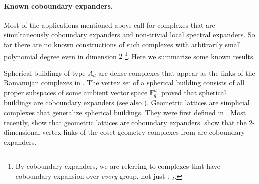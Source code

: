 \documentclass[10pt,a4paper]{article}
\theoremstyle{definition}
\theoremstyle{remark}
\newcommand\sett[2]{\left\{ #1 \left| \; \vphantom{#1 #2} \right. #2  \right\}}
\newcommand{\F}{\mathbb{F}}
\renewcommand{\ge}{\geqslant}
\numberwithin{equation}{section}
\let\origparagraph\paragraph
\renewcommand{\paragraph}[1]{\origparagraph{#1.}}
\begin{document}
%
%

\paragraph{Known coboundary expanders}
Most of the applications mentioned above call for complexes that are simultaneously coboundary expanders and non-trivial local spectral expanders. So far there are no known constructions of such complexes with arbitrarily small polynomial degree even in dimension $2$ \footnote{By coboundary expanders, we are referring to complexes that have coboundary expansion over \textit{every} group, not just \(\F_2\).}. Here we summarize some known results.

Spherical buildings of type \(A_d\) are dense complexes that appear as the links of the Ramanujan complexes in \cite{LubotzkySV2005}. The vertex set of a spherical building consists of all proper subspaces of some ambient vector space $\F_q^d$. \cite{Gromov2010} proved that spherical buildings are coboundary expanders (see also \cite{LubotzkyMM2016}).
Geometric lattices are simplicial complexes that generalize spherical buildings. They were first defined in \cite{KozlovM2019}.
Most recently, \cite{DiksteinD2023cbdry} show that geometric lattices are coboundary expanders.
\cite{KaufmanO2021} show that the $2$-dimensional vertex links of the coset geometry complexes from \cite{kaufmanO2018} are coboundary expanders.
\end{document}
